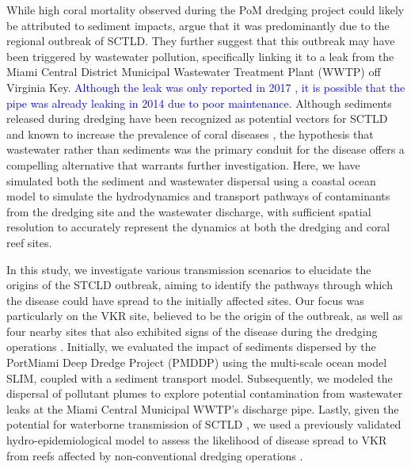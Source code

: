 \documentclass[preprint,12pt,authoryear]{elsarticle}
\newcommand{\modif}[1]{\textcolor{blue}{#1}}
\begin{document}
While high coral mortality observed during the PoM dredging project could likely be attributed to sediment impacts, \cite{gintert2019regional} argue that it was predominantly due to the regional outbreak of SCTLD. They further suggest that this outbreak may have been triggered by wastewater pollution, specifically linking it to a leak from the Miami Central District Municipal Wastewater Treatment Plant (WWTP) off Virginia Key. \modif{Although the leak was only reported in 2017 \citep{staletovich2017}, it is possible that the pipe was already leaking in 2014 due to poor maintenance}. Although sediments released during dredging have been recognized as potential vectors for SCTLD \citep{studivan2022reef} and known to increase the prevalence of coral diseases \citep{pollock2014sediment}, the hypothesis that wastewater rather than sediments was the primary conduit for the disease offers a compelling alternative that warrants further investigation. Here, we have simulated both the sediment and wastewater dispersal using a coastal ocean model to simulate the hydrodynamics and transport pathways of contaminants from the dredging site and the wastewater discharge, with sufficient spatial resolution to accurately represent the dynamics at both the dredging and coral reef sites.

In this study, we investigate various transmission scenarios to elucidate the origins of the STCLD outbreak, aiming to identify the pathways through which the disease could have spread to the initially affected sites. Our focus was particularly on the VKR site, believed to be the origin of the outbreak, as well as four nearby sites that also exhibited signs of the disease during the dredging operations \citep{precht2016unprecedented}. Initially, we evaluated the impact of sediments dispersed by the PortMiami Deep Dredge Project (PMDDP) using the multi-scale ocean model SLIM, coupled with a sediment transport model. Subsequently, we modeled the dispersal of pollutant plumes to explore potential contamination from wastewater leaks at the Miami Central Municipal WWTP’s discharge pipe. Lastly, given the potential for waterborne transmission of SCTLD \citep{aeby2019pathogenesis,eaton2021measuring, meiling2021variable}, we used a previously validated hydro-epidemiological model to assess the likelihood of disease spread to VKR from reefs affected by non-conventional dredging operations \citep{dobbelaere2022connecting}.

\end{document}
